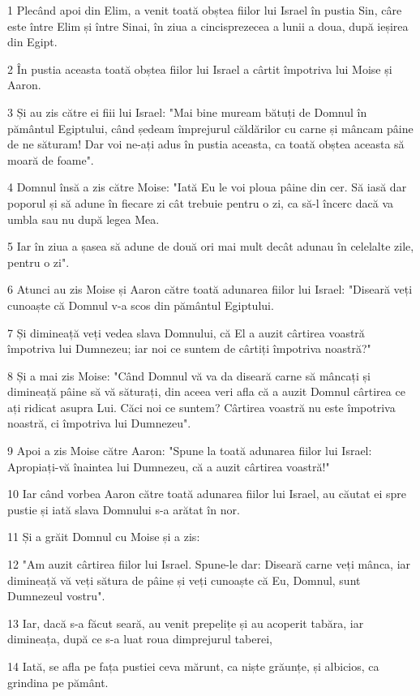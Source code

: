 \par 1 Plecând apoi din Elim, a venit toată obștea fiilor lui Israel în pustia Sin, câre este între Elim și între Sinai, în ziua a cincisprezecea a lunii a doua, după ieșirea din Egipt.
\par 2 În pustia aceasta toată obștea fiilor lui Israel a cârtit împotriva lui Moise și Aaron.
\par 3 Și au zis către ei fiii lui Israel: "Mai bine muream bătuți de Domnul în pământul Egiptului, când ședeam împrejurul căldărilor cu carne și mâncam pâine de ne săturam! Dar voi ne-ați adus în pustia aceasta, ca toată obștea aceasta să moară de foame".
\par 4 Domnul însă a zis către Moise: "Iată Eu le voi ploua pâine din cer. Să iasă dar poporul și să adune în fiecare zi cât trebuie pentru o zi, ca să-l încerc dacă va umbla sau nu după legea Mea.
\par 5 Iar în ziua a șasea să adune de două ori mai mult decât adunau în celelalte zile, pentru o zi".
\par 6 Atunci au zis Moise și Aaron către toată adunarea fiilor lui Israel: "Diseară veți cunoaște că Domnul v-a scos din pământul Egiptului.
\par 7 Și dimineață veți vedea slava Domnului, că El a auzit cârtirea voastră împotriva lui Dumnezeu; iar noi ce suntem de cârtiți împotriva noastră?"
\par 8 Și a mai zis Moise: "Când Domnul vă va da diseară carne să mâncați și dimineață pâine să vă săturați, din aceea veri afla că a auzit Domnul cârtirea ce ați ridicat asupra Lui. Căci noi ce suntem? Cârtirea voastră nu este împotriva noastră, ci împotriva lui Dumnezeu".
\par 9 Apoi a zis Moise către Aaron: "Spune la toată adunarea fiilor lui Israel: Apropiați-vă înaintea lui Dumnezeu, că a auzit cârtirea voastră!"
\par 10 Iar când vorbea Aaron către toată adunarea fiilor lui Israel, au căutat ei spre pustie și iată slava Domnului s-a arătat în nor.
\par 11 Și a grăit Domnul cu Moise și a zis:
\par 12 "Am auzit cârtirea fiilor lui Israel. Spune-le dar: Diseară carne veți mânca, iar dimineață vă veți sătura de pâine și veți cunoaște că Eu, Domnul, sunt Dumnezeul vostru".
\par 13 Iar, dacă s-a făcut seară, au venit prepelițe și au acoperit tabăra, iar dimineața, după ce s-a luat roua dimprejurul taberei,
\par 14 Iată, se afla pe fața pustiei ceva mărunt, ca niște grăunțe, și albicios, ca grindina pe pământ.
